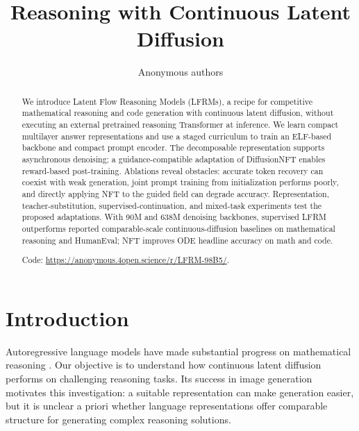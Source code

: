 \documentclass{article}
\title{Reasoning with Continuous Latent Diffusion}
\author{Anonymous authors}
\newcommand{\rev}[1]{{\color{blue}#1}}
\newcommand{\revp}[1]{\par\color{blue}#1\par\color{black}}
\begin{document}
\maketitle

\begin{abstract}
\revp{We introduce Latent Flow Reasoning Models (LFRMs), a recipe for competitive mathematical reasoning and code generation with continuous latent diffusion, without executing an external pretrained reasoning Transformer at inference. We learn compact multilayer answer representations and use a staged curriculum to train an ELF-based backbone and compact prompt encoder. The decomposable representation supports asynchronous denoising; a guidance-compatible adaptation of DiffusionNFT enables reward-based post-training. \rev{Ablations reveal obstacles:} accurate token recovery can coexist with weak generation, joint prompt training from initialization performs poorly, and directly applying NFT to the guided field can degrade accuracy. Representation, teacher-substitution, supervised-continuation, and mixed-task experiments test the proposed adaptations. With 90M and 638M denoising backbones, supervised LFRM outperforms reported comparable-scale continuous-diffusion baselines on mathematical reasoning and HumanEval; \rev{NFT improves ODE headline accuracy on math and code.}}
\rev{Code:} \url{https://anonymous.4open.science/r/LFRM-98B5/}.
\end{abstract}
\setlength{\parskip}{4pt}

\section{Introduction}
\label{sec:introduction}

\revp{Autoregressive language models have made substantial progress on mathematical reasoning \citep{minerva,deepseekr1}. Our objective is to understand how continuous latent diffusion performs on challenging reasoning tasks. Its success in image generation \citep{latentdiffusion} motivates this investigation: a suitable representation can make generation easier, but it is unclear a priori whether language representations offer comparable structure for generating complex reasoning solutions.}
\end{document}
